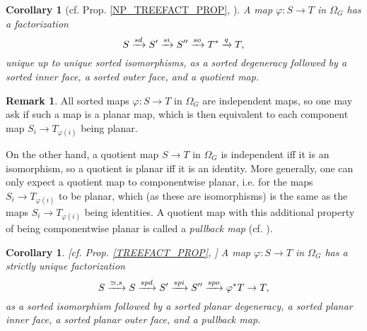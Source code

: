 \documentclass[a4paper,10pt
,draft
]{article}%
\numberwithin{equation}{section}
\numberwithin{figure}{section}
\newtheorem{corollary}[equation]{Corollary}%
\theoremstyle{definition} %
\newtheorem{remark}[equation]{Remark}%
\newtheorem{notation}[equation]{Notation}%
\newcommand{\1}{\ensuremath{\mathbbm 1}}%
\begin{document}
\begin{corollary}[{cf. Prop. \ref{NP_TREEFACT_PROP}, \cite[Rem. 5.49]{Per18}}]
	A map $\varphi \colon S \to T$ in $\Omega_G$ has
	a factorization
	\[
	S \xrightarrow{sd} 
	S' \xrightarrow{si} 
	S'' \xrightarrow{so} 
	T^{\**} \xrightarrow{q} T,
	\]
	unique up to unique 
	sorted isomorphisms, as
	a sorted degeneracy followed by
	a sorted inner face,
	a sorted outer face,
	and a quotient map.
\end{corollary}



\begin{remark}
	All sorted maps
	$\varphi \colon S \to T$ in $\Omega_G$
	are independent maps,
	so one may ask if such a map is a planar map,
	which is then equivalent
	to each component map
	$S_i \to T_{\varphi(i)}$
	being planar.

	On the other hand, a quotient map
	$S \to T$ in $\Omega_G$
	is independent iff it is an isomorphism,
	so a quotient is planar iff it is an identity.
	More generally, 
	one can only expect
	a quotient map to componentwise planar,
	i.e. for the maps 
	$S_i \to T_{\varphi(i)}$
	to be planar, which (as these are isomorphisms) is the same
	as the maps
	$S_i \to T_{\varphi(i)}$
	being identities.
	A quotient map with this additional property
	of being componentwise planar is called 
	a \emph{pullback map} (cf. \cite[Ex. 3.27]{BP_geo}).
\end{remark}


\begin{corollary}\label{OMGFACT COR}
	[{cf. Prop. \ref{TREEFACT_PROP}, \cite[Rem. 5.49]{Per18}}]
	A map $\varphi \colon S \to T$ in $\Omega_G$ has
	a strictly unique factorization
\[
	S \xrightarrow{\simeq,s}
	S \xrightarrow{spd} 
	S' \xrightarrow{spi} 
	S'' \xrightarrow{spo} 
	\varphi^{\**}T \to T,
\]
	as a sorted isomorphism
	followed by a sorted planar degeneracy,
	a sorted planar inner face,
	a sorted planar outer face,
	and a pullback map.
\end{corollary}


\end{document}
